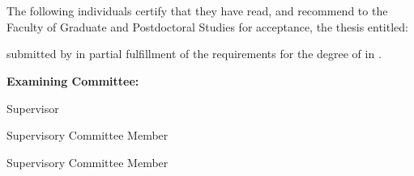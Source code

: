 
\chapter*{}
The following individuals certify that they have read, and recommend to the Faculty of Graduate and Postdoctoral Studies for acceptance, the thesis entitled:


\textbf{\theTitle}

submitted by \textbf{\theAuthor} in partial fulfillment of the requirements for
the degree of \textbf{\theDegree} in \textbf{\theProgramTitle}.

\textbf{Examining Committee:}

 {Supervisor}

 {Supervisory Committee Member}

 {Supervisory Committee Member}




